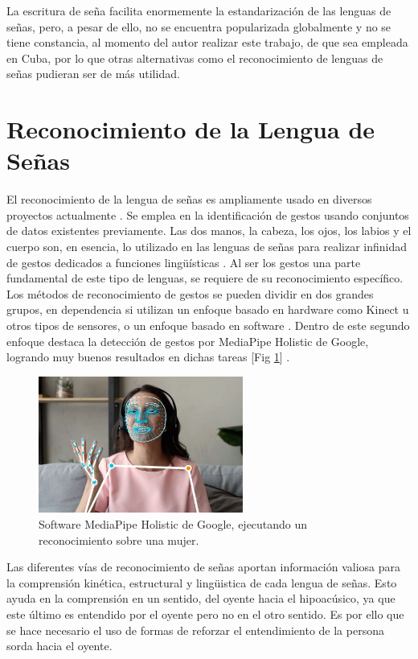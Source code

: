 La escritura de seña facilita enormemente la estandarización de las lenguas de señas, pero, a pesar de ello, no se encuentra popularizada globalmente y no se tiene constancia, al momento del autor realizar este trabajo, de que sea empleada en Cuba, por lo que otras alternativas como el reconocimiento de lenguas de señas pudieran ser de más utilidad.

\section{Reconocimiento de la Lengua de Señas}\label{section:state-of-the-art:slr}
El reconocimiento de la lengua de señas es ampliamente usado en diversos proyectos actualmente . Se emplea en la identificación de gestos usando conjuntos de datos existentes
previamente. Las dos manos, la cabeza, los ojos, los
labios y el cuerpo  son, en esencia, lo utilizado en las lenguas de señas para realizar infinidad de gestos dedicados a funciones lingüísticas . Al ser los gestos una parte fundamental de este tipo de lenguas, se requiere de su reconocimiento específico. Los métodos de reconocimiento de gestos se pueden dividir en dos grandes grupos, en dependencia si utilizan un enfoque basado en hardware como Kinect u otros tipos de sensores, o un enfoque basado en software . Dentro de este segundo enfoque destaca la detección de gestos por MediaPipe Holistic de Google, logrando muy buenos resultados en dichas tareas  [Fig \ref{fig:mediapipe}] .


\begin{figure}[ht!]
    \centering
    \includegraphics[width=0.6\textwidth]{Graphics/mediapipe.png}
    \caption{Software MediaPipe Holistic de Google, ejecutando un reconocimiento sobre una mujer.}
    \label{fig:mediapipe}
\end{figure}

Las diferentes vías de reconocimiento de señas aportan información valiosa para la comprensión kinética, estructural y lingüistica de cada lengua de señas. Esto ayuda en la comprensión en un sentido, del oyente hacia el hipoacúsico, ya que este último es entendido por el oyente pero no en el otro sentido. Es por ello que se hace necesario el uso de formas de reforzar el entendimiento de la persona sorda hacia el oyente.

